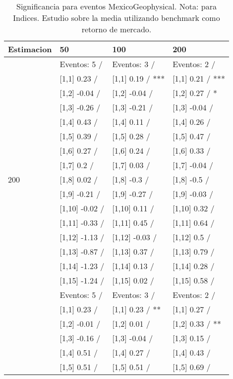 \begin{table}

\caption{Significancia para eventos MexicoGeophysical. Nota: para Indices. Estudio sobre la media utilizando benchmark como retorno de mercado.}
\centering
\begin{tabular}[t]{llll}
\toprule
Estimacion & 50 & 100 & 200\\
\midrule
 & Eventos:  5 / & Eventos:  3 / & Eventos:  2 /\\
 & {}[1,1] 0.23  / & {}[1,1] 0.19  / *** & {}[1,1] 0.21  / ***\\
 & {}[1,2] -0.04  / & {}[1,2] -0.04  / & {}[1,2] 0.27  / *\\
 & {}[1,3] -0.26  / & {}[1,3] -0.21  / & {}[1,3] -0.04  /\\
 & {}[1,4] 0.43  / & {}[1,4] 0.11  / & {}[1,4] 0.26  /\\
\addlinespace
 & {}[1,5] 0.39  / & {}[1,5] 0.28  / & {}[1,5] 0.47  /\\
 & {}[1,6] 0.27  / & {}[1,6] 0.24  / & {}[1,6] 0.33  /\\
 & {}[1,7] 0.2  / & {}[1,7] 0.03  / & {}[1,7] -0.04  /\\
200 & {}[1,8] 0.02  / & {}[1,8] -0.3  / & {}[1,8] -0.5  /\\
 & {}[1,9] -0.21  / & {}[1,9] -0.27  / & {}[1,9] -0.03  /\\
\addlinespace
 & {}[1,10] -0.02  / & {}[1,10] 0.11  / & {}[1,10] 0.32  /\\
 & {}[1,11] -0.33  / & {}[1,11] 0.45  / & {}[1,11] 0.64  /\\
 & {}[1,12] -1.13  / & {}[1,12] -0.03  / & {}[1,12] 0.5  /\\
 & {}[1,13] -0.87  / & {}[1,13] 0.37  / & {}[1,13] 0.79  /\\
 & {}[1,14] -1.23  / & {}[1,14] 0.13  / & {}[1,14] 0.28  /\\
\addlinespace
 & {}[1,15] -1.24  / & {}[1,15] 0.02  / & {}[1,15] 0.58  /\\
 & Eventos:  5 / & Eventos:  3 / & Eventos:  2 /\\
 & {}[1,1] 0.23  / & {}[1,1] 0.23  / ** & {}[1,1] 0.27  /\\
 & {}[1,2] -0.01  / & {}[1,2] 0.01  / & {}[1,2] 0.33  / **\\
 & {}[1,3] -0.16  / & {}[1,3] -0.04  / & {}[1,3] 0.15  /\\
\addlinespace
 & {}[1,4] 0.51  / & {}[1,4] 0.27  / & {}[1,4] 0.43  /\\
 & {}[1,5] 0.51  / & {}[1,5] 0.51  / & {}[1,5] 0.69  /\\

\end{tabular}
\end{table}
